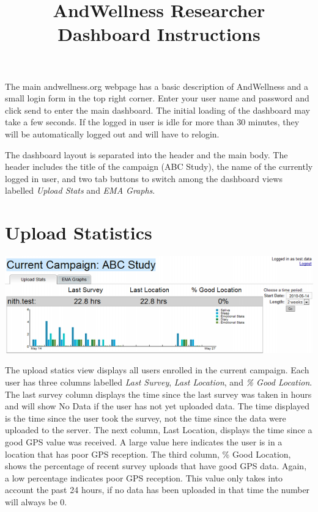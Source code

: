 \documentclass{article}
\title{AndWellness Researcher Dashboard Instructions}
\begin{document}
\maketitle

The main andwellness.org webpage has a basic description of AndWellness and a small
login form in the top right corner.  Enter your user name
and password and click send to enter the main dashboard.  The initial loading of the dashboard may take a few seconds.
If the logged in user is idle for more than 30 minutes, they will be automatically logged out and will have to relogin.

The dashboard layout is separated into the header and the main body.
The header includes the title of the campaign (ABC Study), the
name of the currently logged in user, and two tab buttons to switch among the
dashboard views labelled \emph{Upload Stats} and \emph{EMA Graphs}.

\section*{Upload Statistics}
\begin{center}
	\includegraphics[width=6in]{dashboard-shrunk}
\end{center}

The upload statics view displays all users enrolled in the current
campaign.  Each user has three columns labelled \emph{Last Survey},
\emph{Last Location}, and \emph{\% Good Location}.  The last survey column
displays the time since the last survey was taken in hours and
will show No Data if the user has not yet uploaded data.  The time displayed
is the time since the user took the survey, not the time since the data were uploaded to the server.
The next column, Last Location, displays the time since a good GPS value was received.  A large
value here indicates the user is in a location that has poor GPS reception.  The third column, \% Good Location,
shows the percentage of recent survey uploads that have good GPS data.  Again, a low percentage indicates
poor GPS reception.  This value only takes into account the past 24 hours, if no data has been uploaded in that
time the number will always be 0.
\end{document}
